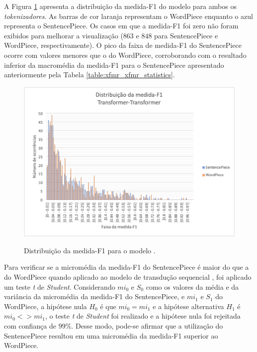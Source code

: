 A Figura \ref{fig:result_f1_range_xfmr} apresenta a distribuição da medida-F1 do modelo para ambos os \textit{tokenizadores}. As barras de cor laranja representam o WordPiece enquanto o azul representa o SentencePiece. Os casos em que a medida-F1 foi zero não foram exibidos para melhorar a visualização ($863$ e $848$ para SentencePiece e WordPiece, respectivamente). O pico da faixa de medida-F1 do SentencePiece ocorre com valores menores que o do WordPiece, corroborando com o resultado inferior da macromédia da medida-F1 para o SentencePiece apresentado anteriormente pela Tabela \ref{table:xfmr_xfmr_statistics}.
\begin{figure}[htbp]
    \centering
        \caption{Distribuição da medida-F1 para o modelo \xfmrxfmr{}.}
        \includegraphics[width=\textwidth]{resources/images/results/result_F1_range_xfmr_ptbr.png}
        \label{fig:result_f1_range_xfmr}
\end{figure}

Para verificar se a micromédia da medida-F1 do SentencePiece é maior do que a do WordPiece quando aplicado ao modelo de transdução sequencial \xfmrxfmr{}, foi aplicado um teste \textit{t} de \textit{Student}. Considerando $mi_0$ e $S_0$ como os valores da média e da variância da micromédia da medida-F1 do SentencePiece, e $mi_1$ e $S_1$ do WordPiece, a hipótese nula $H_0$ é que $mi_0 = mi_1$ e a hipótese alternativa $H_1$ é $mi_0 <> mi_1$, o teste \textit{t} de \textit{Student} foi realizado e a hipótese nula foi rejeitada com confiança de $99\%$. Desse modo, pode-se afirmar que a utilização do SentencePiece resultou em uma micromédia da medida-F1 superior ao WordPiece.

